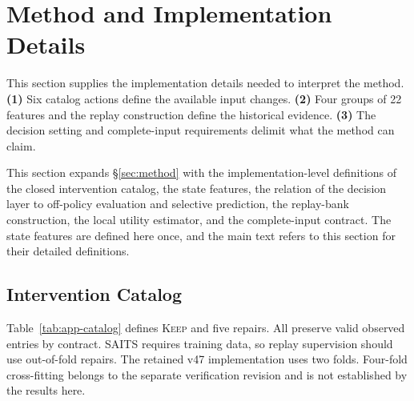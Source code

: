 \documentclass{article}
\begin{document}
\section{Method and Implementation Details}
\label{app:method-details}

This section supplies the implementation details needed to interpret the method. \textbf{(1)} Six catalog actions define the available input changes. \textbf{(2)} Four groups of 22 features and the replay construction define the historical evidence. \textbf{(3)} The decision setting and complete-input requirements delimit what the method can claim.

This section expands \S\ref{sec:method} with the implementation-level definitions of the
closed intervention catalog, the state features, the relation of the decision layer to
off-policy evaluation and selective prediction, the replay-bank construction, the local
utility estimator, and the complete-input contract. The state features are defined here
once, and the main text refers to this section for their detailed definitions.

\subsection{Intervention Catalog}
\label{app:catalog}
Table~\ref{tab:app-catalog} defines \textsc{Keep} and five repairs. All preserve valid observed
entries by contract. SAITS requires training data, so replay supervision should use
out-of-fold repairs. The retained v47 implementation uses two folds. Four-fold cross-fitting
belongs to the separate verification revision and is not established by the results here.
\end{document}
